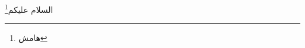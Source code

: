 \documentclass{article}
\begin{document}
\lipsum
\lipsum
\lipsum

\pagebreak


السلام عليكم\footnote{هامش}
\end{document}
